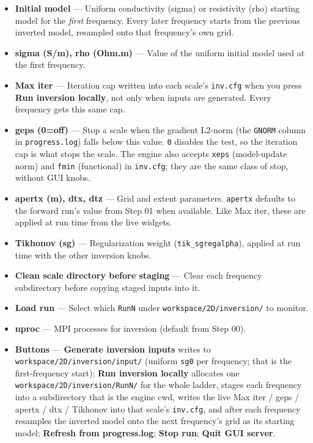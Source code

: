 \documentclass[11pt,a4paper]{article}
\begin{document}
\begin{itemize}

  \item \textbf{Initial model} — Uniform conductivity (sigma) or resistivity (rho) starting model for the \emph{first} frequency. Every later frequency starts from the previous inverted model, resampled onto that frequency's own grid.

  \item \textbf{sigma (S/m), rho (Ohm.m)} — Value of the uniform initial model used at the first frequency.

  \item \textbf{Max iter} — Iteration cap written into each scale's \texttt{inv.cfg} when you press \textbf{Run inversion locally}, not only when inputs are generated. Every frequency gets this same cap.

  \item \textbf{geps (0=off)} — Stop a scale when the gradient L2-norm (the \texttt{GNORM} column in \texttt{progress.log}) falls below this value. \texttt{0} disables the test, so the iteration cap is what stops the scale. The engine also accepts \texttt{xeps} (model-update norm) and \texttt{fmin} (functional) in \texttt{inv.cfg}; they are the same class of stop, without GUI knobs.

  \item \textbf{apertx (m), dtx, dtz} — Grid and extent parameters. \texttt{apertx} defaults to the forward run's value from Step 01 when available. Like Max iter, these are applied at run time from the live widgets.

  \item \textbf{Tikhonov (sg)} — Regularization weight (\texttt{tik\_sgregalpha}), applied at run time with the other inversion knobs.

  \item \textbf{Clean scale directory before staging} — Clear each frequency subdirectory before copying staged inputs into it.

  \item \textbf{Load run} — Select which \texttt{RunN} under \texttt{workspace/2D/inversion/} to monitor.

  \item \textbf{nproc} — MPI processes for inversion (default from Step 00).

  \item \textbf{Buttons} — \textbf{Generate inversion inputs} writes to \texttt{workspace/2D/inversion/input/} (uniform \texttt{sg0} per frequency; that is the first-frequency start); \textbf{Run inversion locally} allocates one \texttt{workspace/2D/inversion/RunN/} for the whole ladder, stages each frequency into a subdirectory that is the engine cwd, writes the live Max iter / geps / apertx / dtx / Tikhonov into that scale's \texttt{inv.cfg}, and after each frequency resamples the inverted model onto the next frequency's grid as its starting model; \textbf{Refresh from progress.log}; \textbf{Stop run}; \textbf{Quit GUI server}.

\end{itemize}
\end{document}
